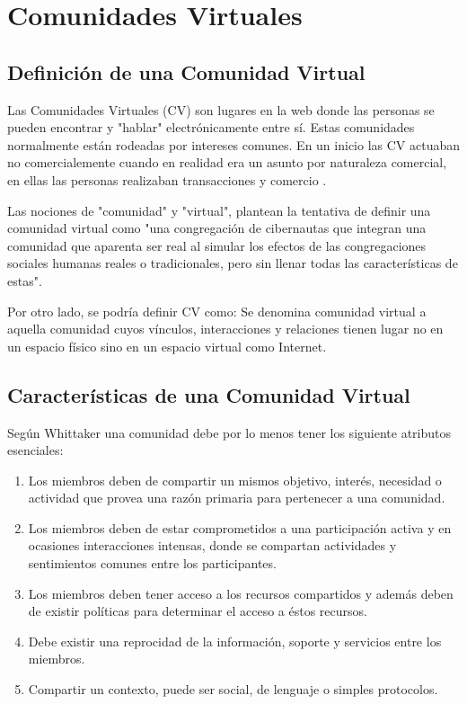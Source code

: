 
\chapter{Comunidades Virtuales} %

\label{ch:comunidades_virtuales} %


\section{Definición de una Comunidad Virtual}

Las Comunidades Virtuales (CV) son lugares en la web donde las personas se pueden encontrar y "hablar" electrónicamente entre sí. Estas comunidades normalmente están rodeadas por intereses comunes. En un inicio las CV actuaban no comercialemente cuando en realidad era un asunto por naturaleza comercial, en ellas las personas realizaban transacciones y comercio \cite{gupta:2005}. 

Las nociones de "comunidad" y "virtual", plantean la tentativa de definir una comunidad virtual como "una congregación de cibernautas que integran una comunidad que aparenta ser real al simular los efectos de las congregaciones sociales humanas reales o tradicionales, pero sin llenar todas las características de estas".

Por otro lado, se podría definir CV como: Se denomina comunidad virtual a aquella comunidad cuyos vínculos, interacciones y relaciones tienen lugar no en un espacio físico sino en un espacio virtual como Internet.



\section{Características de una Comunidad Virtual}

Según Whittaker \cite{whittaker:1997} una comunidad debe por lo menos tener los siguiente atributos esenciales: 

\begin{enumerate}
\item Los miembros deben de compartir un mismos objetivo, interés, necesidad o actividad que provea una razón primaria para pertenecer a una comunidad.  
\item Los miembros deben de estar comprometidos a una participación activa y en ocasiones interacciones intensas, donde se compartan actividades y sentimientos comunes entre los participantes.
\item Los miembros deben tener acceso a los recursos compartidos y además deben de existir políticas para determinar el acceso a éstos recursos.
\item Debe existir una reprocidad de la información, soporte y servicios entre los miembros.
\item Compartir un contexto, puede ser social, de lenguaje o simples protocolos. 
\end{enumerate}

